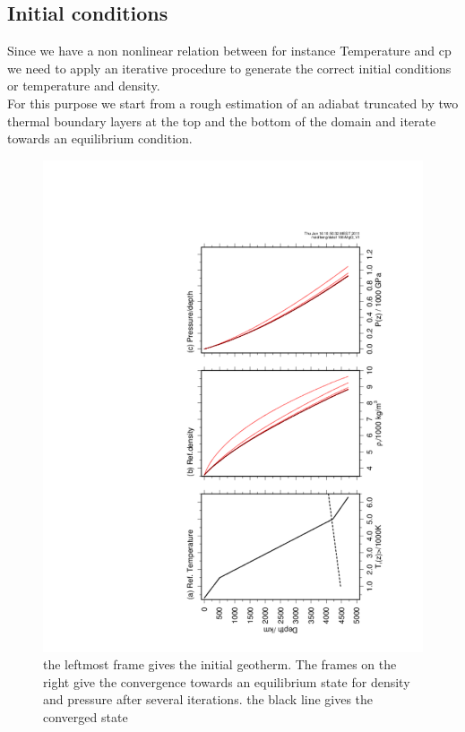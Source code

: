\documentclass[11pt]{article}
\begin{document}
\subsection{Initial conditions}
Since we have a non nonlinear relation between for instance Temperature and cp we need to apply an iterative procedure to generate the correct initial conditions or temperature and density. \\
For this purpose we start from a rough estimation of an adiabat truncated by two thermal boundary layers at the top and the bottom of the domain and iterate towards an equilibrium condition.
\begin{figure}
\centering
\includegraphics[width=\textwidth,angle=-90]{./profiles_refmod.pdf}
\caption{the leftmost frame gives the initial geotherm. The frames on the right give the convergence towards an equilibrium state for density and pressure after several iterations. the black line gives the converged state}
\end{figure}
\end{document}
